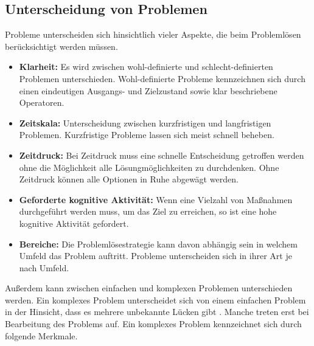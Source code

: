 \subsection{Unterscheidung von Problemen}
\label{2:Unterscheidung-Probleme}
Probleme unterscheiden sich hinsichtlich vieler Aspekte, die beim Problemlösen berücksichtigt werden müssen. \cite{Betsch2011}
\begin{itemize}
\item \textbf{Klarheit:} Es wird zwischen wohl-definierte und schlecht-definierten Problemen unterschieden. Wohl-definierte Probleme kennzeichnen sich durch einen eindeutigen Ausgangs- und Zielzustand sowie klar beschriebene Operatoren.
\item \textbf{Zeitskala:} Unterscheidung zwischen kurzfristigen und langfristigen Problemen. Kurzfristige Probleme lassen sich meist schnell beheben.
\item \textbf{Zeitdruck:} Bei Zeitdruck muss eine schnelle Entscheidung getroffen werden ohne die Möglichkeit alle Lösungmöglichkeiten zu durchdenken. Ohne Zeitdruck können alle Optionen in Ruhe abgewägt werden.
\item \textbf{Geforderte kognitive Aktivität:} Wenn eine Vielzahl von Maßnahmen durchgeführt werden muss, um das Ziel zu erreichen, so ist eine hohe kognitive Aktivität gefordert.
\item \textbf{Bereiche:} Die Problemlösestrategie kann davon abhängig sein in welchem Umfeld das Problem auftritt. Probleme unterscheiden sich in ihrer Art je nach Umfeld.
\end{itemize}
Außerdem kann zwischen einfachen und komplexen Problemen unterschieden werden. Ein komplexes Problem unterscheidet sich von einem einfachen Problem in der Hinsicht, dass es mehrere unbekannte Lücken  gibt \cite{Betsch2011}. Manche treten erst bei Bearbeitung des Problems auf. Ein komplexes Problem kennzeichnet sich durch folgende Merkmale. \cite{Funke2015}
